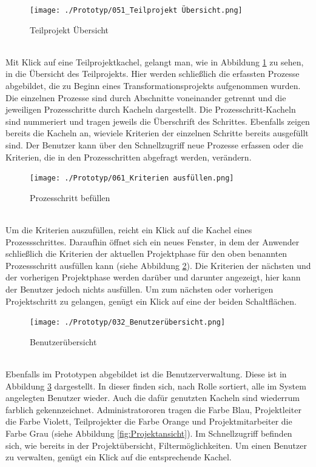 \begin{figure}[h!]
    \centering
    \texttt{[image: ./Prototyp/051\_Teilprojekt Übersicht.png]}
    \caption[Prototyp: Teilprojekt Übersicht]{Teilprojekt Übersicht}
    \label{fig:TeilprojektÜbersicht}
\end{figure}
\\Mit Klick auf eine Teilprojektkachel, gelangt man, wie in Abbildung \ref{fig:TeilprojektÜbersicht} zu sehen, in die Übersicht des Teilprojekts. Hier werden schließlich die erfassten Prozesse abgebildet, die zu Beginn eines Transformationsprojekts aufgenommen wurden. Die einzelnen Prozesse sind durch Abschnitte voneinander getrennt und die jeweiligen Prozesschritte durch Kacheln dargestellt. Die Prozesschritt-Kacheln sind nummeriert und tragen jeweils die Überschrift des Schrittes. Ebenfalls zeigen bereits die Kacheln an, wieviele Kriterien der einzelnen Schritte bereits ausgefüllt sind. Der Benutzer kann über den Schnellzugriff neue Prozesse erfassen oder die Kriterien, die in den Prozesschritten abgefragt werden, verändern.
\begin{figure}[h!]
    \centering
    \texttt{[image: ./Prototyp/061\_Kriterien ausfüllen.png]}
    \caption[Prototyp: Prozesschritt befüllen]{Prozesschritt befüllen}
    \label{fig:ProzesschrittBefuellen}
\end{figure}
\\Um die Kriterien auszufüllen, reicht ein Klick auf die Kachel eines Prozessschrittes. Daraufhin öffnet sich ein neues Fenster, in dem der Anwender schließlich die Kriterien der aktuellen Projektphase für den oben benannten Prozessschritt ausfüllen kann (siehe Abbildung \ref{fig:ProzesschrittBefuellen}). Die Kriterien der nächsten und der vorherigen Projektphase werden darüber und darunter angezeigt, hier kann der Benutzer jedoch nichts ausfüllen. Um zum nächsten oder vorherigen Projektschritt zu gelangen, genügt ein Klick auf eine der beiden Schaltflächen.
\begin{figure}[h!]
    \centering
    \texttt{[image: ./Prototyp/032\_Benutzerübersicht.png]}
    \caption[Prototyp: Benutzerübersicht]{Benutzerübersicht}
    \label{fig:Benutzeruebersicht}
\end{figure}
\\Ebenfalls im Prototypen abgebildet ist die Benutzerverwaltung. Diese ist in Abbildung \ref{fig:Benutzeruebersicht} dargestellt. In dieser finden sich, nach Rolle sortiert, alle im System angelegten Benutzer wieder. Auch die dafür genutzten Kacheln sind wiederrum farblich gekennzeichnet. Administratororen tragen die Farbe Blau, Projektleiter die Farbe Violett, Teilprojekter die Farbe Orange und Projektmitarbeiter die Farbe Grau (siehe Abbildung \ref{fig:Projektansicht}). Im Schnellzugriff befinden sich, wie bereits in der Projektübersicht, Filtermöglichkeiten. Um einen Benutzer zu verwalten, genügt ein Klick auf die entsprechende Kachel.
